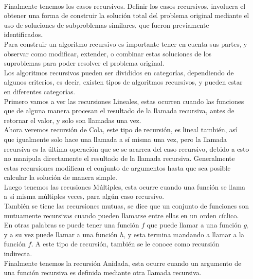 \documentclass[12pt,twoside]{article}
\begin{document}
\newline
\\ Finalmente tenemos los casos recursivos. Definir los casos recursivos, involucra el obtener una forma de construir la solución total del problema original mediante el uso de soluciones de subproblemas similares, que fueron previamente identificados.
\\ Para construir un algoritmo recursivo es importante tener en cuenta sus partes, y observar como modificar, extender, o combinar estas soluciones de los suproblemas para poder resolver el problema original.
\newline
\\ Los algoritmos recursivos pueden ser divididos en categorías, dependiendo de algunos criterios, es decir, existen tipos de algoritmos recursivos, y pueden estar en diferentes categorías.
\\ Primero vamos a ver las recursiones Lineales, estas ocurren cuando las funciones que de alguna manera procesan el resultado de la llamada recursiva, antes de retornar el valor, y solo son llamadas una vez.
\\ Ahora veremos recursión de Cola, este tipo de recursión, es lineal también, así que igualmente solo hace una llamada a sí misma una vez, pero la llamada recursiva es la última operación que se se acarrea del caso recursivo, debido a esto no manipula directamente el resultado de la llamada recursiva. Generalmente estas recursiones modifican el conjunto de argumentos hasta que sea posible calcular la solución de manera simple.
\\ Luego tenemos las recusiones Múltiples, esta ocurre cuando una función se llama a sí misma múltiples veces, para algún caso recursivo.
\\ También se tiene las recursiones mutuas, se dice que un conjunto de funciones son mutuamente recursivas cuando pueden llamarse entre ellas en un orden cíclico. En otras palabras se puede tener una función $f$ que puede llamar a una función $g$, y a su vez puede llamar a una función $h$, y esta termina mandando a llamar a la función $f$. A este tipo de recursión, también se le conoce como recursión indirecta.
\\ Finalmente tenemos la recursión Anidada, esta ocurre cuando un argumento de una función recursiva es definida mediante otra llamada recursiva.
\newline
\end{document}
